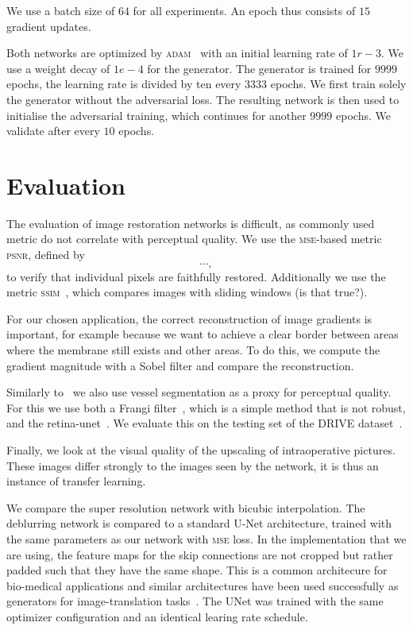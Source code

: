 \documentclass{scrartcl}
\begin{document}
We use a batch size of $64$ for all experiments.
An epoch thus consists of $15$ gradient updates.

Both networks are optimized by \textsc{adam}~\cite{Adam} with an initial learning rate of $1r-3$.
We use a weight decay of $1e-4$ for the generator.
The generator is trained for $9999$ epochs, the learning rate is divided by ten every $3333$ epochs.
We first train solely the generator without the adversarial loss.
The resulting network is then used to initialise the adversarial training, which continues for another $9999$ epochs.
We validate after every $10$ epochs.

\section{Evaluation}
The evaluation of image restoration networks is difficult, as commonly used metric do not correlate with perceptual quality.
We use the \textsc{mse}-based metric \textsc{psnr}, defined by
\begin{equation}
  \label{eq:psnr}
  \cdots,
\end{equation}
to verify that individual pixels are faithfully restored.
Additionally we use the metric \textsc{ssim}~\cite{Ssim}, which compares images with sliding windows (is that true?).

For our chosen application, the correct reconstruction of image gradients is important, for example because we want to achieve a clear border between areas where the membrane still exists and other areas.
To do this, we compute the gradient magnitude with a Sobel filter and compare the reconstruction.

Similarly to~\cite{SaliencyGAN} we also use vessel segmentation as a proxy for perceptual quality.
For this we use both a Frangi filter~\cite{Frangi}, which is a simple method that is not robust, and the retina-unet~\cite{RetinaUnet}.
We evaluate this on the testing set of the DRIVE dataset~\cite{Drive}.

Finally, we look at the visual quality of the upscaling of intraoperative pictures.
These images differ strongly to the images seen by the network, it is thus an instance of transfer learning.

We compare the super resolution network with bicubic interpolation.
The deblurring network is compared to a standard U-Net architecture, trained with the same parameters as our network with \textsc{mse} loss.
In the implementation that we are using, the feature maps for the skip connections are not cropped but rather padded such that they have the same shape.
This is a common architecure for bio-medical applications and similar architectures have been used successfully as generators for image-translation tasks~\cite{PatchGAN}.
The UNet was trained with the same optimizer configuration and an identical learing rate schedule.
\end{document}
